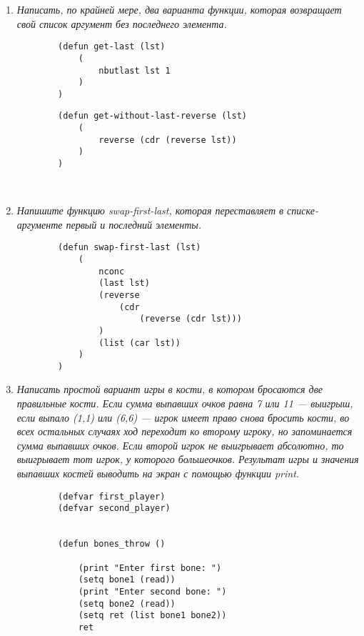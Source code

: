 \begin{enumerate}[wide=0pt]
	\begin{lstlisting}
		(defun get-last (lst)
			(
				car (last lst)
			)
		)
	\end{lstlisting}

	\begin{lstlisting}
		(defun get-last-reverse (lst)
			(
				car (reverse lst)
			)
		)
	


	\end{lstlisting}

	\item  \textit{Написать, по крайней мере, два варианта функции, 
	которая возвращает
	свой список аргумент без последнего элемента.}

	\begin{lstlisting}
		(defun get-last (lst)
			(
				nbutlast lst 1
			)
		)
	\end{lstlisting}

	\begin{lstlisting}
		(defun get-without-last-reverse (lst)
			(
				reverse (cdr (reverse lst))
			)
		)
	
	
	\end{lstlisting}

	\item  \textit{Напишите функцию swap-first-last, 
	которая переставляет в списке-
	аргументе первый и последний элементы.}
	
	\begin{lstlisting}
		(defun swap-first-last (lst)
			(
				nconc 
				(last lst)
				(reverse 
					(cdr 
						(reverse (cdr lst)))
				)
				(list (car lst))
			)
		)
	\end{lstlisting}

	\item  \textit{Написать простой вариант игры в кости, в котором бросаются две
	правильные кости. Если сумма выпавших очков равна 7 или 11 —
	выигрыш, если выпало (1,1) или (6,6) — игрок имеет право снова
	бросить кости, во всех остальных случаях ход переходит ко второму
	игроку, но запоминается сумма выпавших очков. Если второй игрок не
	выигрывает абсолютно, то выигрывает тот игрок, у которого большеочков. Результат игры и значения выпавших костей выводить на экран с
	помощью функции print.}

	\begin{lstlisting}
		(defvar first_player)
		(defvar second_player)
		
		
		(defun bones_throw ()
		
			(print "Enter first bone: ")
			(setq bone1 (read))
			(print "Enter second bone: ")
			(setq bone2 (read))
			(setq ret (list bone1 bone2))
			ret
		

\end{lstlisting}
\end{enumerate}
